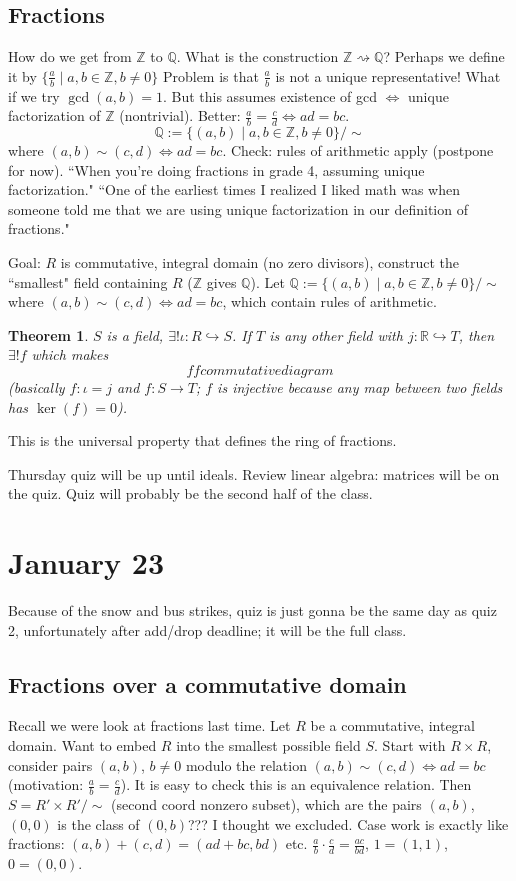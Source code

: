 \documentclass{article}
\theoremstyle{plain}
\newtheorem{theorem}{Theorem}
\theoremstyle{remark}
\newcommand{\Z}{{\mathbb Z}}
\newcommand{\Q}{{\mathbb Q}}
\newcommand{\R}{{\mathbb R}}
\begin{document}
\subsection{Fractions}
How do we get from $\Z$ to $\Q$.
What is the construction $\Z \rightsquigarrow \Q$?
Perhaps we define it by $\{\frac{a}{b} \mid a,b \in \Z, b \neq 0\}$
Problem is that $\frac{a}{b}$ is not a unique representative!
What if we try $\gcd(a,b) = 1$.
But this assumes existence of gcd $\iff $ unique factorization of $\Z$ (nontrivial).
Better: $\frac{a}{b} = \frac{c}{d} \iff ad = bc$.
\[
	\Q := \{(a,b) \mid a,b \in \Z, b \neq 0\}/\sim
\]
where $(a,b) \sim (c,d) \iff ad = bc$.
Check: rules of arithmetic apply (postpone for now).
``When you're doing fractions in grade 4, assuming unique factorization."
``One of the earliest times I realized I liked math
was when someone told me that we are using unique factorization
in our definition of fractions."

Goal: $R$ is commutative, integral domain (no zero divisors),
construct the ``smallest" field containing $R$ ($\Z$ gives $\Q$).
Let $\Q := \{(a,b) \mid a,b \in \Z, b \neq 0\}/\sim$
where $(a,b) \sim (c,d) \iff ad = bc$,
which contain rules of arithmetic.
\begin{theorem}
	$S$ is a field, $\exists! \iota \colon R \hookrightarrow S$.
	If $T$ is any other field with $j \colon \R \hookrightarrow T$,
	then $\exists! f$ which makes
	\[
		ff commutative diagram
	\]
	(basically $f \colon \iota = j$ and $f \colon S \to T$;
	$f$ is injective because any map between two fields has $\ker(f) = 0$).
\end{theorem}
This is the universal property that defines the ring of fractions.

Thursday quiz will be up until ideals.
Review linear algebra: matrices will be on the quiz.
Quiz will probably be the second half of the class.

\section{January 23}
Because of the snow and bus strikes, quiz is just gonna be the same
day as quiz 2, unfortunately after add/drop deadline;
it will be the full class.

\subsection{Fractions over a commutative domain}
Recall we were look at fractions last time.
Let $R$ be a commutative, integral domain.
Want to embed $R$ into the smallest possible field $S$.
Start with $R \times R$, consider pairs $(a,b)$, $b\neq 0$
modulo the relation $(a,b) \sim (c,d) \iff ad = bc$
(motivation: $\frac{a}{b} = \frac{c}{d}$).
It is easy to check this is an equivalence relation.
Then $S = R' \times R' /\sim$ (second coord nonzero subset),
which are the pairs $(a,b)$, $(0,0)$ is the class of $(0,b)$??? I thought we excluded.
Case work is exactly like fractions:
$(a,b) + (c,d) = (ad+bc,bd)$ etc.
$\frac{a}{b}\cdot\frac{c}{d} = \frac{ac}{bd}$, $1 = (1,1)$, $0 = (0,0)$.
\end{document}
